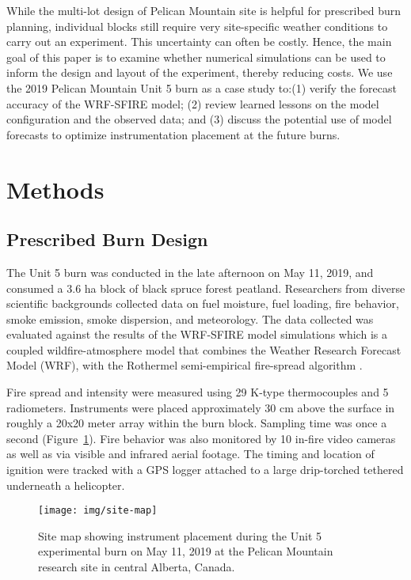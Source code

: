 \documentclass[preprints,article,accept,moreauthors,pdftex]{Definitions/mdpi}
\begin{document}
While the multi-lot design of Pelican Mountain site is helpful for prescribed burn planning, individual blocks still require very site-specific weather conditions to carry out an experiment. This uncertainty can often be costly. Hence, the main goal of this paper is to examine whether numerical simulations can be used to inform the design and layout of the experiment, thereby reducing costs. We use the 2019 Pelican Mountain Unit 5 burn as a case study to:(1) verify the forecast accuracy of the WRF-SFIRE model; (2) review learned lessons on the model configuration and the observed data; and (3) discuss the potential use of model forecasts to optimize instrumentation placement at the future burns.

\section{Methods}
\subsection{Prescribed Burn Design}

The Unit 5 burn was conducted in the late afternoon on May 11, 2019, and consumed a 3.6 ha block of black spruce forest peatland. Researchers from diverse scientific backgrounds collected data on fuel moisture, fuel loading, fire behavior, smoke emission, smoke dispersion, and meteorology. The data collected was evaluated against the results of the WRF-SFIRE model simulations which is a coupled wildfire-atmosphere model that combines the Weather Research Forecast Model (WRF), with the Rothermel semi-empirical fire-spread algorithm \cite{mandel_coupled_2011,mandel_recent_2014}.

Fire spread and intensity were measured using 29 K-type thermocouples and 5 radiometers. Instruments were placed approximately 30 cm above the surface in roughly a 20x20 meter array within the burn block. Sampling time was once a second (Figure~\ref{fig1}). Fire behavior was also monitored by 10 in-fire video cameras as well as via visible and infrared aerial footage. The timing and location of ignition were tracked with a GPS logger attached to a large drip-torched tethered underneath a helicopter.


\begin{figure}[H]
\centering
 \texttt{[image: img/site-map]}
 \caption{Site map showing instrument placement during the Unit 5 experimental burn on May 11, 2019 at the Pelican Mountain research site in central Alberta, Canada. \label{fig1}}
 \end{figure}
\end{document}
